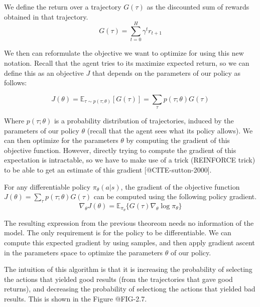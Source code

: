 \begin{definition}
    We define the return over a trajectory $G(\tau)$ as the discounted sum of
    rewards obtained in that trajectory.
    \begin{equation}
        G(\tau) = \sum_{t=0}^{H} \gamma^{t} r_{t+1}
    \end{equation}
\end{definition}

We then can reformulate the objective we want to optimize for using this new notation.
Recall that the agent tries to its maximize expected return, so we can define this as
an objective $J$ that depends on the parameters of our policy as follows:

\begin{equation}
    J(\theta) = \mathbb{E}_{\tau \sim p(\tau;\theta)}[G(\tau)] = \sum_{\tau} p(\tau;\theta) G(\tau)
\end{equation}

Where $p(\tau;\theta)$ is a probability distribution of trajectories, induced by
the parameters of our policy $\theta$ (recall that the agent sees what its policy allows).
We can then optimize for the parameters $\theta$ by computing the gradient of this
objective function. However, directly trying to compute the gradient of this expectation
is intractable, so we have to make use of a trick (REINFORCE trick) to be able to
get an estimate of this gradient [@CITE-sutton-2000].

\begin{theorem}
    For any differentiable policy $\pi_{\theta}(a|s)$, the gradient of the
    objective function $J(\theta) = \sum_{\tau} p(\tau;\theta) G(\tau)$ 
    can be computed using the following policy gradient.
    \begin{equation}
        \nabla_{\theta} J(\theta) = \mathbb{E}_{\pi_{\theta}} \lbrace G(\tau) \nabla_{\theta} \log \pi_{\theta} \rbrace
    \end{equation}
\end{theorem}

The resulting expression from the previous theoreom needs no information of the model.
The only requirement is for the policy to be differentiable. We can compute this expected
gradient by using samples, and then apply gradient ascent in the parameters space to optimize 
the parameters $\theta$ of our policy.

The intuition of this algorithm is that it is increasing the probability of selecting
the actions that yielded good results (from the trajectories that gave good returns), 
and decreasing the probability of selectiong the actions that yielded bad results. This
is shown in the Figure @FIG-2.7.

